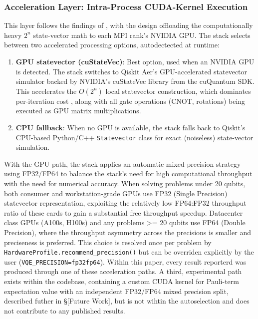 \subsubsection{Acceleration Layer: Intra-Process CUDA-Kernel Execution}
This layer follows the findings of \textcite{bayraktar2023cuquantum}, with the design
offloading the computationally heavy $2^n$ state-vector math to each MPI rank's NVIDIA GPU. The stack selects between
two accelerated processing options, autodectected at runtime: 
\begin{enumerate}
    \item \textbf{GPU statevector (cuStateVec)}: Best option, used when an NVIDIA GPU is detected. The stack switches to Qiskit Aer's GPU-accelerated statevector simulator backed by NVIDIA's cuStateVec library from the cuQuantum SDK. This accelerates the $O(2^n)$ local statevector construction, which dominates per-iteration cost \parencite{bayraktar2023cuquantum}, along with all gate operations (CNOT, rotations) being executed as GPU matrix multiplications.
    \item \textbf{CPU fallback}: When no GPU is available, the stack falls back to Qiskit's CPU-based Python/C++ \texttt{Statevector} class for exact (noiseless) state-vector simulation. 
\end{enumerate}

With the GPU path, the stack applies an automatic mixed-precision strategy using FP32/FP64 to balance the stack's need 
for high computational throughput with the need for numerical accuracy. When solving problems under 20 qubits, both consumer and workstation-grade GPUs 
use FP32 (Single Precision) statevector representation, exploiting the relatively low FP64:FP32 throughput ratio of these cards to gain a 
substantial free throughput speedup. Datacenter class GPUs (A100s, H100s) and any problems >= 20 qubits use FP64 (Double Precision), where the throughput 
asymmetry across the precisions is smaller and preciseness is preferred. This choice is resolved once per problem by \texttt{HardwareProfile.recommend_precision()} but can
be overriden explicitly by the user (\texttt{VQE_PRECISION=fp32\textbar fp64}). Within this paper, every result reporterd was produced
through one of these acceleration paths. A third, experimental path exists within the codebase, containing a custom CUDA kernel for Pauli-term expectation value with an 
independent FP32/FP64 mixed precision split, described futher in \S[Future Work], but is not wihtin the autoselection and does not contribute to any published results.  

